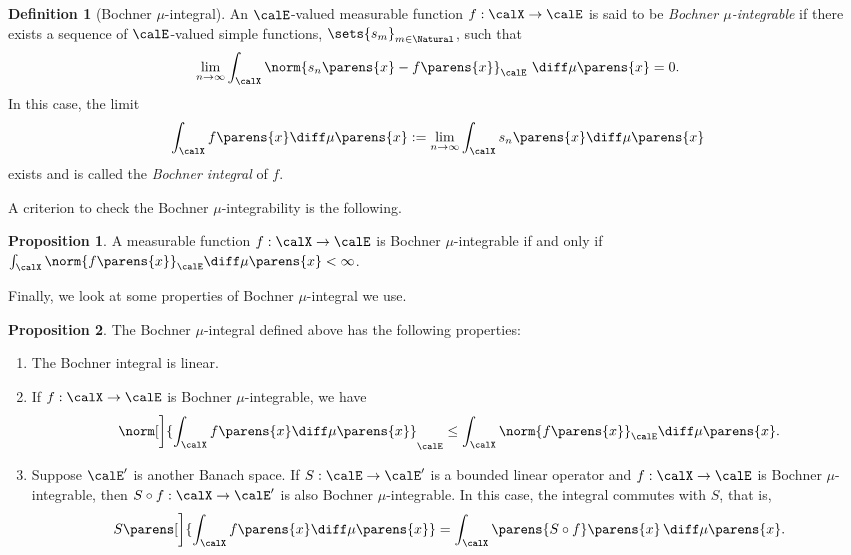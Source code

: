 \documentclass[12pt]{article}
\theoremstyle{definition}
\newtheorem{definition}{Definition}
\theoremstyle{theorem}
\newtheorem{proposition}{Proposition}
\theoremstyle{remark}
\begin{document}
\begin{definition}[Bochner $\mu$-integral]\label{def-bochner-integral}
	An $\calE$-valued measurable function $f: \calX \to \calE$ is said to be \textit{Bochner $\mu$-integrable} if there exists a sequence of $\calE$-valued simple functions, $\sets{s_m}_{m \in \Natural}$, such that
	\begin{align}
		\lim_{n \to \infty} \int_{\calX} \norm{s_n \parens{x} - f \parens{x}}_{\calE} \ \diff \mu \parens{x} = 0. 
	\end{align}
	In this case, the limit
	\begin{align*}
		\int_{\calX} f \parens{x} \diff \mu \parens{x} := \lim_{n \to \infty} \int_{\calX} s_n \parens{x} \diff \mu \parens{x}
	\end{align*}
	exists and is called the \textit{Bochner integral} of $f$. 
\end{definition}

A criterion to check the Bochner $\mu$-integrability is the following. 

\begin{proposition}\label{prop-bochner-integrability}
	A measurable function $f: \calX \to \calE$ is Bochner $\mu$-integrable if and only if $\int_{\calX} \norm{f \parens{x}}_{\calE} \diff \mu \parens{x} < \infty$. 
\end{proposition}

Finally, we look at some properties of Bochner $\mu$-integral we use. 

\begin{proposition}\label{prop-properties-bochcher-integral}
	The Bochner $\mu$-integral defined above has the following properties: 
	\begin{enumerate}[label=(\alph*)]
		\item \label{prop-properties-bochcher-integral-a} The Bochner integral is linear. 
		\item \label{prop-properties-bochcher-integral-b} If $f: \calX \to \calE$ is Bochner $\mu$-integrable, we have 
		\begin{align*}
			\norm[\bigg]{\int_{\calX} f \parens{x} \diff \mu \parens{x}}_{\calE} \le \int_{\calX} \norm{f \parens{x}}_{\calE} \diff \mu \parens{x}. 
		\end{align*}
		\item \label{prop-properties-bochcher-integral-c} Suppose $\calE'$ is another Banach space. If $S: \calE \to \calE'$ is a bounded linear operator and $f: \calX \to \calE$ is Bochner $\mu$-integrable, then $S \circ f: \calX \to \calE'$ is also Bochner $\mu$-integrable. In this case, the integral commutes with $S$, that is, 
		\begin{align*}
			S \parens[\bigg]{\int_{\calX} f \parens{x} \diff \mu \parens{x}} = \int_{\calX} \parens{S \circ f} \parens{x} \, \diff \mu \parens{x}. 
		\end{align*}
	\end{enumerate}
\end{proposition}
\end{document}
